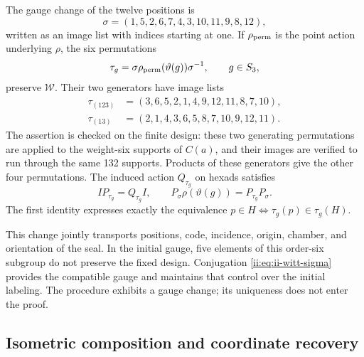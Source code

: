 The gauge change of the twelve positions is
\begin{equation}
 \sigma=(1,5,2,6,7,4,3,10,11,9,8,12),
 \label{ii:eq:ii-witt-sigma}
\end{equation}
written as an image list with indices starting at one. If
\(\rho_{\rm perm}\) is the point action underlying \(\rho\), the
six permutations
\[
 \tau_g=\sigma\rho_{\rm perm}(\vartheta(g))\sigma^{-1},\qquad g\in S_3,
\]
preserve \(\mathcal W\). Their two generators have image lists
\[
\begin{aligned}
 \tau_{(123)}&=(3,6,5,2,1,4,9,12,11,8,7,10),\\
 \tau_{(13)}&=(2,1,4,3,6,5,8,7,10,9,12,11).
\end{aligned}
\]
The assertion is checked on the finite design: these two generating
permutations are applied to the weight-six supports of
\(C(a)\), and their images are verified to run through the
same 132 supports. Products of these generators give the other
four permutations. The induced action \(Q_{\tau_g}\) on hexads
satisfies
\begin{equation}
 I P_{\tau_g}=Q_{\tau_g}I,
 \qquad
 P_\sigma\rho(\vartheta(g))=P_{\tau_g}P_\sigma.
 \label{ii:eq:ii-witt-recalibration}
\end{equation}
The first identity expresses exactly the equivalence
\(p\in H\Longleftrightarrow\tau_g(p)\in\tau_g(H)\).

This change jointly transports positions, code, incidence,
origin, chamber, and orientation of the seal. In the initial gauge, five
elements of this order-six subgroup do not preserve the fixed design.
Conjugation \eqref{ii:eq:ii-witt-sigma} provides the compatible gauge
and maintains that control over the initial labeling. The procedure
exhibits a gauge change; its uniqueness does not enter the proof.

\subsection{Isometric composition and coordinate recovery}

